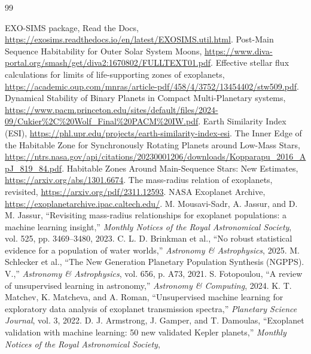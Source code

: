 \documentclass[conference]{IEEEtran}
\begin{document}

\begin{thebibliography}{99}

 EXO-SIMS package, Read the Docs, \url{https://exosims.readthedocs.io/en/latest/EXOSIMS.util.html}.
 Post-Main Sequence Habitability for Outer Solar System Moons, \url{https://www.diva-portal.org/smash/get/diva2:1670802/FULLTEXT01.pdf}.
 Effective stellar flux calculations for limits of life-supporting zones of exoplanets, \url{https://academic.oup.com/mnras/article-pdf/458/4/3752/13454402/stw509.pdf}.
 Dynamical Stability of Binary Planets in Compact Multi-Planetary systems, \url{https://www.pacm.princeton.edu/sites/default/files/2024-09/Cukier%2C%20Wolf_Final%20PACM%20IW.pdf}.
 Earth Similarity Index (ESI), \url{https://phl.upr.edu/projects/earth-similarity-index-esi}.
 The Inner Edge of the Habitable Zone for Synchronously Rotating Planets around Low-Mass Stars, \url{https://ntrs.nasa.gov/api/citations/20230001206/downloads/Kopparapu_2016_ApJ_819_84.pdf}.
 Habitable Zones Around Main-Sequence Stars: New Estimates, \url{https://arxiv.org/abs/1301.6674}.
 The mass-radius relation of exoplanets, revisited, \url{https://arxiv.org/pdf/2311.12593}.
 NASA Exoplanet Archive, \url{https://exoplanetarchive.ipac.caltech.edu/}.
M. Mousavi-Sadr, A. Jassur, and D. M. Jassur,
``Revisiting mass-radius relationships for exoplanet populations:
a machine learning insight,''
\textit{Monthly Notices of the Royal Astronomical Society},
vol. 525, pp. 3469--3480, 2023.
C. L. D. Brinkman et al.,
``No robust statistical evidence for a population of water worlds,''
\textit{Astronomy \& Astrophysics}, 2025.
M. Schlecker et al.,
``The New Generation Planetary Population Synthesis (NGPPS). V.,''
\textit{Astronomy \& Astrophysics}, vol. 656, p. A73, 2021.
S. Fotopoulou,
``A review of unsupervised learning in astronomy,''
\textit{Astronomy \& Computing}, 2024.
K. T. Matchev, K. Matcheva, and A. Roman,
``Unsupervised machine learning for exploratory data analysis of
exoplanet transmission spectra,''
\textit{Planetary Science Journal}, vol. 3, 2022.
D. J. Armstrong, J. Gamper, and T. Damoulas,
``Exoplanet validation with machine learning: 50 new validated
Kepler planets,''
\textit{Monthly Notices of the Royal Astronomical Society},

\end{thebibliography}
\end{document}
